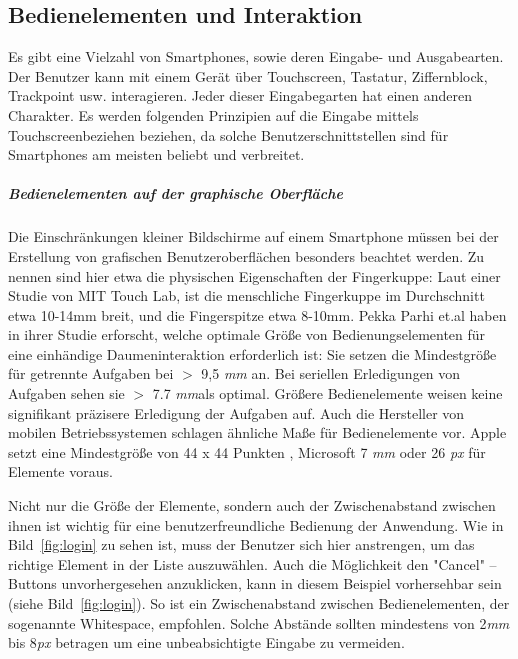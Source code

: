 \subsection{Bedienelementen und Interaktion}
\label{sub:Benutzerschnittstellen}

Es gibt eine Vielzahl von Smartphones, sowie deren Eingabe- und Ausgabearten. Der Benutzer kann mit einem Gerät über Touchscreen, Tastatur, Ziffernblock, Trackpoint usw. interagieren. Jeder dieser Eingabegarten hat einen anderen Charakter. Es werden folgenden Prinzipien auf die Eingabe mittels Touchscreenbeziehen beziehen, da solche Benutzerschnittstellen sind für Smartphones am meisten beliebt und verbreitet.

\subparagraph{Bedienelementen auf der graphische Oberfläche} 
\label{subp:gro_ere_interface_elementen}

Die Einschränkungen kleiner Bildschirme auf einem Smartphone müssen bei der Erstellung von grafischen Benutzeroberflächen besonders beachtet werden. Zu nennen sind hier etwa die physischen Eigenschaften der Fingerkuppe: Laut einer Studie von MIT Touch Lab, ist die menschliche Fingerkuppe im Durchschnitt etwa 10-14mm breit, und die Fingerspitze etwa 8-10mm\cite{Srinivasan:2003uu}.  Pekka Parhi  et.al haben in ihrer Studie \cite{Parhi:2006gh} erforscht, welche optimale Größe von Bedienungselementen für eine einhändige Daumeninteraktion erforderlich ist: Sie setzen die Mindestgröße für getrennte Aufgaben bei $>$ 9,5 \textit{mm} an.  Bei seriellen Erledigungen von Aufgaben sehen sie $>$ 7.7 \textit{mm}als optimal. Größere Bedienelemente weisen keine signifikant präzisere Erledigung der Aufgaben auf.
Auch die Hersteller von mobilen Betriebssystemen schlagen ähnliche Maße für Bedienelemente vor. Apple setzt eine Mindestgröße von 44 x 44 Punkten \cite{Apple}, Microsoft 7 \textit{mm} oder 26 \textit{px}\cite{lukeGUI} für Elemente voraus.

Nicht nur die Größe der Elemente, sondern auch der Zwischenabstand zwischen ihnen ist wichtig für eine benutzerfreundliche Bedienung der Anwendung. Wie in Bild~\ref{fig:login} zu sehen ist, muss der Benutzer sich hier anstrengen, um das richtige Element in der Liste auszuwählen. Auch die Möglichkeit den "Cancel" – Buttons unvorhergesehen anzuklicken, kann in diesem Beispiel vorhersehbar sein (siehe Bild~\ref{fig:login}). So ist ein Zwischenabstand zwischen Bedienelementen, der sogenannte Whitespace,  empfohlen. Solche Abstände sollten mindestens von 2\textit{mm} bis 8\textit{px} betragen\cite{lukeGUI} um eine unbeabsichtigte Eingabe zu vermeiden.

